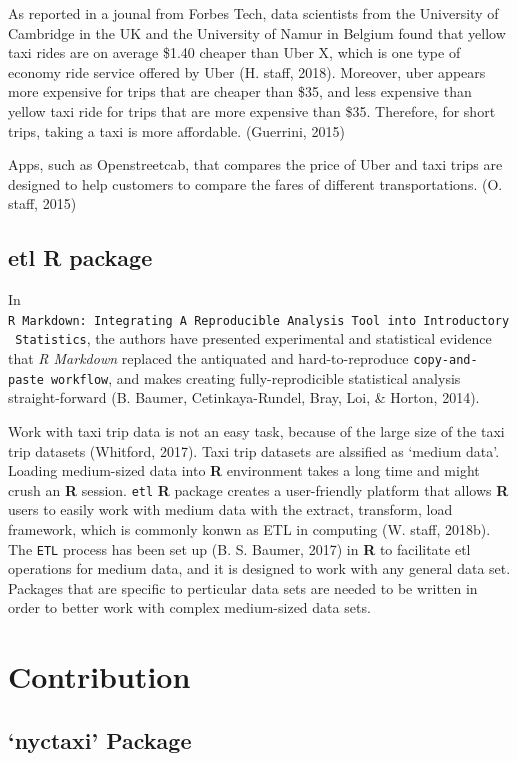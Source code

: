 \documentclass[12pt,twoside]{reedthesis}
\theoremstyle{definition}
\theoremstyle{definition}
\theoremstyle{definition}
\theoremstyle{remark}
\begin{document}
As reported in a jounal from Forbes Tech, data scientists from the
University of Cambridge in the UK and the University of Namur in Belgium
found that yellow taxi rides are on average \$1.40 cheaper than Uber X,
which is one type of economy ride service offered by Uber (H. staff,
2018). Moreover, uber appears more expensive for trips that are cheaper
than \$35, and less expensive than yellow taxi ride for trips that are
more expensive than \$35. Therefore, for short trips, taking a taxi is
more affordable. (Guerrini, 2015)

Apps, such as Openstreetcab, that compares the price of Uber and taxi
trips are designed to help customers to compare the fares of different
transportations. (O. staff, 2015)

\subsection{etl R package}\label{etl-r-package}

In
\texttt{R\ Markdown:\ Integrating\ A\ Reproducible\ Analysis\ Tool\ into\ Introductory\ Statistics},
the authors have presented experimental and statistical evidence that
\emph{R Markdown} replaced the antiquated and hard-to-reproduce
\texttt{copy-and-paste\ workflow}, and makes creating fully-reprodicible
statistical analysis straight-forward (B. Baumer, Cetinkaya-Rundel,
Bray, Loi, \& Horton, 2014).

Work with taxi trip data is not an easy task, because of the large size
of the taxi trip datasets (Whitford, 2017). Taxi trip datasets are
alssified as `medium data'. Loading medium-sized data into \textbf{R}
environment takes a long time and might crush an \textbf{R} session.
\texttt{etl} \textbf{R} package creates a user-friendly platform that
allows \textbf{R} users to easily work with medium data with the
extract, transform, load framework, which is commonly konwn as ETL in
computing (W. staff, 2018b). The \texttt{ETL} process has been set up
(B. S. Baumer, 2017) in \textbf{R} to facilitate etl operations for
medium data, and it is designed to work with any general data set.
Packages that are specific to perticular data sets are needed to be
written in order to better work with complex medium-sized data sets.

\section{Contribution}\label{contribution}

\subsection{\texorpdfstring{`nyctaxi'
Package}{nyctaxi Package}}\label{nyctaxi-package}
\end{document}
